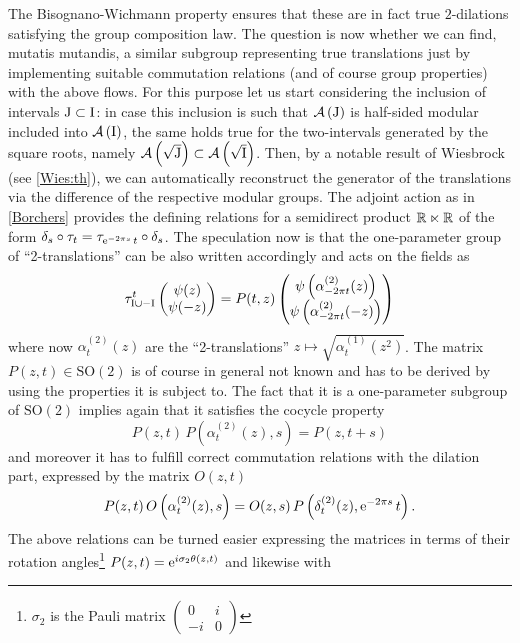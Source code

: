 \bigskip
 The Bisognano-Wichmann property ensures that these are
 in fact true $2$-dilations satisfying the group composition law. 
 The question is now whether we can find, mutatis 
 mutandis, a similar subgroup representing true translations
 just by implementing suitable commutation relations (and 
 of course group properties) with the above flows.  
 For this purpose let us start considering the inclusion 
 of intervals $\textrm{J}\subset\textrm{I}$: in case this
 inclusion is such that $\mathcal{A}\left(\textrm{J}\right)$ is half-sided
 modular included into $\mathcal{A}\left(\textrm{I}\right)$, the same holds true
 for the two-intervals generated by the square roots,
 namely $\mathcal{A}\left(\sqrt{\textrm{J}}\right)\subset\mathcal{A}\left(\sqrt{\textrm{I}}\right)$.
 Then, by a notable result of Wiesbrock (see \ref{Wies:th}), we 
 can automatically 
 reconstruct the generator of the translations via the 
 difference of the respective modular groups. The adjoint
 action as in \ref{Borchers} provides the defining
 relations for a semidirect product $\mathbb{R}\ltimes \mathbb{R}$
 of the form $\delta_s\circ\tau_t = \tau_{\operatorname{e}^{-2\pi s}t}
 \circ\delta_s$.
 The speculation now is that the one-parameter group of 
 ``2-translations'' can be also written accordingly and
 acts on the fields as
 \[
 \tau^t_{\textrm{I}\cup -\textrm{I}}
 \begin{pmatrix}
 \psi(z)\\
 \psi(-z)
 \end{pmatrix}
 = P(t,z)
 \begin{pmatrix}
 \psi\left(\alpha^{(2)}_{-2\pi t}(z)\right)\\
 \psi\left(\alpha^{(2)}_{-2\pi t}(-z)\right)
 \end{pmatrix}
 \]
 where now $\alpha^{(2)}_{t}(z)$ are the ``2-translations''
 $z\mapsto \sqrt{\alpha^{(1)}_{t}(z^2)}$. The matrix $P(z,t)
 \in\textrm{SO}(2)$ is of course in general not known and has 
 to be derived by using the properties it is subject to. The 
 fact that it is a one-parameter subgroup of $\textrm{SO}(2)$
 implies again that it satisfies the cocycle property
 \[
 P(z,t)\,P\left(\alpha^{(2)}_{t}(z),s\right)=P(z,t+s)
 \]
 and moreover it has to fulfill correct commutation relations
 with the dilation part, expressed by the matrix $O(z,t)$
 \[
 P(z,t)\,O\left(\alpha^{(2)}_{t}(z),s\right)= O(z,s)\, 
 P\left(\delta^{(2)}_{t}(z), \operatorname{e}^{-2\pi s}t\right). 
 \]
 The above relations can be turned easier expressing
 the matrices in terms of their rotation angles\footnote
 {$\sigma_2$ is the Pauli matrix
 $
 \begin{pmatrix}
 0 & i\\
 -i&0
 \end{pmatrix}
 $} $P(z,t)=\operatorname{e}^{i\sigma_2 \theta(z,t)}$ and likewise with 
